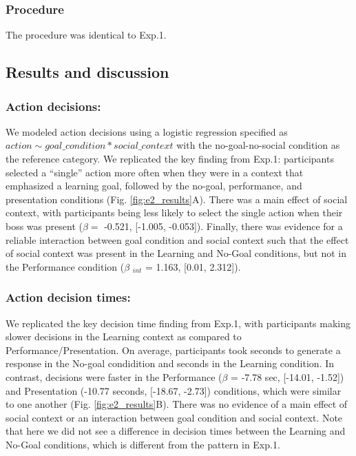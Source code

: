 \documentclass[10pt, letterpaper]{article}
\begin{document}
\subsubsection{Procedure}\label{procedure-1}

The procedure was identical to Exp.1.

\subsection{Results and discussion}\label{results-and-discussion-1}

\subsubsection{Action decisions:}\label{action-decisions-1}

We modeled action decisions using a logistic regression specified as
\texttt{$action \sim goal\_condition * social\_context$} with the
no-goal-no-social condition as the reference category. We replicated the
key finding from Exp.1: participants selected a ``single'' action more
often when they were in a context that emphasized a learning goal,
followed by the no-goal, performance, and presentation conditions (Fig.
\ref{fig:e2_results}A). There was a main effect of social context, with
participants being less likely to select the single action when their
boss was present (\(\beta =\) -0.521, {[}-1.005, -0.053{]}). Finally,
there was evidence for a reliable interaction between goal condition and
social context such that the effect of social context was present in the
Learning and No-Goal conditions, but not in the Performance condition
(\(\beta\) \(_{int}\) = 1.163, {[}0.01, 2.312{]}).

\subsubsection{Action decision times:}\label{action-decision-times-1}

We replicated the key decision time finding from Exp.1, with
participants making slower decisions in the Learning context as compared
to Performance/Presentation. On average, participants took seconds to
generate a response in the No-goal condidition and seconds in the
Learning condition. In contrast, decisions were faster in the
Performance (\(\beta\) = -7.78 sec, {[}-14.01, -1.52{]}) and
Presentation (-10.77 seconds, {[}-18.67, -2.73{]}) conditions, which
were similar to one another (Fig. \ref{fig:e2_results}B). There was no
evidence of a main effect of social context or an interaction between
goal condition and social context. Note that here we did not see a
difference in decision times between the Learning and No-Goal
conditions, which is different from the pattern in Exp.1.
\end{document}

